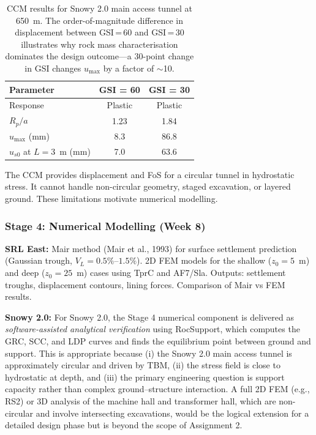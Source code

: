 \documentclass[a4paper,12pt]{article}
\begin{document}
\begin{table}[h!]
\centering
\small
\begin{tabular}{l c c}
\toprule
\textbf{Parameter} & \textbf{GSI = 60} & \textbf{GSI = 30} \\
\midrule
Response & Plastic & Plastic \\
$R_p/a$ & 1.23 & 1.84 \\
$u_{\max}$ (mm) & 8.3 & 86.8 \\
$u_{s0}$ at $L=3$~m (mm) & 7.0 & 63.6 \\
\bottomrule
\end{tabular}
\caption{CCM results for Snowy 2.0 main access tunnel at 650~m. The order-of-magnitude difference in displacement between GSI\,=\,60 and GSI\,=\,30 illustrates why rock mass characterisation dominates the design outcome---a 30-point change in GSI changes $u_{\max}$ by a factor of $\sim$10.}
\end{table}

\begin{notebox}
The CCM provides displacement and FoS for a circular tunnel in hydrostatic stress. It cannot handle non-circular geometry, staged excavation, or layered ground. These limitations motivate numerical modelling.
\end{notebox}

\subsubsection{Stage 4: Numerical Modelling (Week 8)}

\textbf{SRL East:} Mair method (Mair et al., 1993) for surface settlement prediction (Gaussian trough, $V_L = 0.5\%$--$1.5\%$). 2D FEM models for the shallow ($z_0=5$~m) and deep ($z_0=25$~m) cases using TprC and AF7/Sla. Outputs: settlement troughs, displacement contours, lining forces. Comparison of Mair vs FEM results.

\textbf{Snowy 2.0:} For Snowy 2.0, the Stage 4 numerical component is delivered as \textit{software-assisted analytical verification} using RocSupport, which computes the GRC, SCC, and LDP curves and finds the equilibrium point between ground and support. This is appropriate because (i) the Snowy 2.0 main access tunnel is approximately circular and driven by TBM, (ii) the stress field is close to hydrostatic at depth, and (iii) the primary engineering question is support capacity rather than complex ground--structure interaction. A full 2D FEM (e.g., RS2) or 3D analysis of the machine hall and transformer hall, which are non-circular and involve intersecting excavations, would be the logical extension for a detailed design phase but is beyond the scope of Assignment 2.
\end{document}
